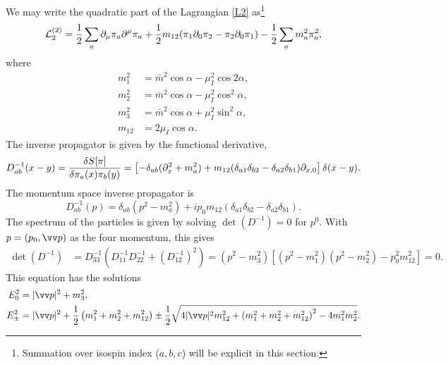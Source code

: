 We may write the quadratic part of the Lagrangian \autoref{L2} as\footnote{Summation over isospin index ($a,b,c$) will be explicit in this section.}
%
\begin{align}
    \label{quadratic lagrangian}
    \mathcal{L}_2^{(2)}
    =
    \frac{1}{2} \sum_a \partial_\mu \pi_a \partial^\mu \pi_a
    + \frac{1}{2} m_{12} (\pi_1 \partial_0 \pi_2 - \pi_2 \partial_0 \pi_1)
    - \frac{1}{2} \sum_a m_a^2 \pi_a^2,
\end{align}
%
where
%
\begin{align}
    \label{m1}
    m_1^2 &= \bar m^2 \cos{\alpha} - \mu_I^2 \cos{2\alpha}, \\
    \label{m2}
    m_2^2 &= \bar m^2 \cos{\alpha} - \mu_I^2 \cos^2{\alpha}, \\
    \label{m3}
    m_3^2 &= \bar m^2 \cos{\alpha} + \mu_I^2 \sin^2{\alpha}, \\
    \label{m12}
    m_{12} &= 2 \mu_I \cos{\alpha}.
\end{align}
%
The inverse propagator is given by the functional derivative, 
%
\begin{equation}
    D_{ab}^{-1}(x - y)
    = 
    \fdv{S[\pi]}{\pi_a(x)\pi_b(y)}
    =
    \left[
        - \delta_{ab}(\partial^2_x + m_a^2) 
        +  m_{12}(\delta_{a1} \delta_{b2} - \delta_{a2}\delta_{b1}) \partial_{x,0}    
    \right]\delta(x - y).
\end{equation}
%
The momentum space inverse propagator is
%
\begin{equation}
    D_{ab}^{-1}(p)
    =
    \delta_{ab}(p^2 - m_a^2)
    +  i p_0 m_{12}(\delta_{a1} \delta_{b2} - \delta_{a2}\delta_{b1}) .
\end{equation}
%
The spectrum of the particles is given by solving $\det(D^{-1}) = 0$ for $p^0$. With $p = (p_0, \vv p)$ as the four momentum, this gives
%
\begin{align*}
    \det(D^{-1}) & = D^{-1}_{33} \left(D^{-1}_{11} D^{-1}_{22} + (D^{-1}_{12})^2\right)
    = \left(p^2 - m^2_3\right)
    \left[
        \left(p^2 - m^2_1\right)
        \left(p^2 - m^2_2\right)
        - p_0^2 m_{12}^2
    \right] = 0.
\end{align*}
%
This equation has the solutions
%
\begin{align}
    \label{dispresion relation pi 0}
    E_0^2 &= |\vv p|^2 + m_3^2, \\
    \label{dispresion relation pi pm}
    E_\pm^2
    & = |\vv p|^2 +
    \frac{1}{2}
    \left(
        m_1^2 + m_2^2 + m_{12}^2 
    \right)
    \pm 
    \frac{1}{2}
    \sqrt{
        4|\vv p|^2m_{12}^2 
        +
        \left(
            m_1^2 + m_2^2 + m_{12}^2
        \right)^2
        - 4 m_1^2 m_2^2
    }.
\end{align}

